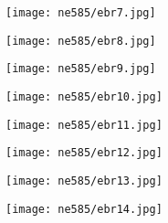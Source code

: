 \documentclass[aspectratio=1610,pdftex,dvipsnames,compress,xcolor={dvipsnames}]{beamer}
\begin{document}
\begin{frame}{}
    \begin{figure}
        \centering
        \texttt{[image: ne585/ebr7.jpg]}
    \end{figure}
\end{frame}


\begin{frame}{}
    \begin{figure}
        \centering
        \texttt{[image: ne585/ebr8.jpg]}
    \end{figure}
\end{frame}


\begin{frame}{}
    \begin{figure}
        \centering
        \texttt{[image: ne585/ebr9.jpg]}
    \end{figure}
\end{frame}


\begin{frame}{}
    \begin{figure}
        \centering
        \texttt{[image: ne585/ebr10.jpg]}
    \end{figure}
\end{frame}


\begin{frame}{}
    \begin{figure}
        \centering
        \texttt{[image: ne585/ebr11.jpg]}
    \end{figure}
\end{frame}


\begin{frame}{}
    \begin{figure}
        \centering
        \texttt{[image: ne585/ebr12.jpg]}
    \end{figure}
\end{frame}


\begin{frame}{}
    \begin{figure}
        \centering
        \texttt{[image: ne585/ebr13.jpg]}
    \end{figure}
\end{frame}


\begin{frame}{}
    \begin{figure}
        \centering
        \texttt{[image: ne585/ebr14.jpg]}
    \end{figure}
\end{frame}
\end{document}
